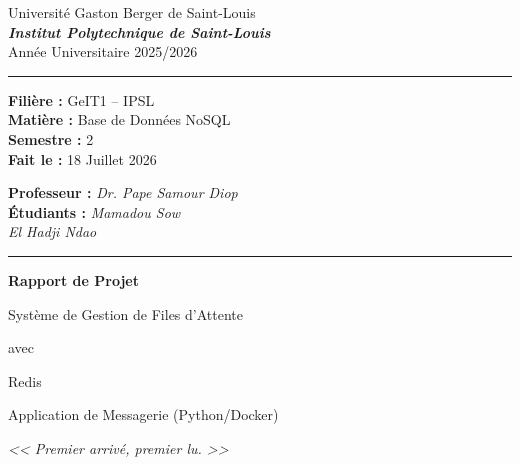 \documentclass[12pt,a4paper]{article}
\begin{document}
\begin{titlepage}
\thispagestyle{empty}
\begin{center}

\vspace*{1.5cm}

Universit\'e Gaston Berger de Saint-Louis\\[0.3cm]
\textbf{\textit{Institut Polytechnique de Saint-Louis}}\\[0.3cm]
Ann\'ee Universitaire 2025/2026

\vspace{1cm}
\noindent\rule{\textwidth}{0.5pt}

\begin{flushleft}
\textbf{Fili\`ere :} GeIT1 -- IPSL\\
\textbf{Mati\`ere :} Base de Donn\'ees NoSQL\\
\textbf{Semestre :} 2\\
\textbf{Fait le :} 18 Juillet 2026
\end{flushleft}
\begin{flushright}
\vspace{-2.5cm}
\textbf{Professeur :} \textit{Dr. Pape Samour Diop}\\
\textbf{\'Etudiants :} \textit{Mamadou Sow}\\
 \textit{El Hadji Ndao}
\end{flushright}

\noindent\rule{\textwidth}{0.5pt}

\vspace{3cm}

{\LARGE \textbf{Rapport de Projet}}

\vspace{1cm}

{\Huge \color{blue!70!black} Syst\`eme de Gestion de Files d'Attente}

\vspace{0.3cm}
{\large avec}
\vspace{0.3cm}

{\Huge \color{blue!70!black} Redis}

\vspace{0.5cm}

{\large Application de Messagerie (Python/Docker)}

\vspace{4cm}

{\large\color{blue!50!black}\textit{<< Premier arriv\'e, premier lu. >>}}

\end{center}
\end{titlepage}
\end{document}
